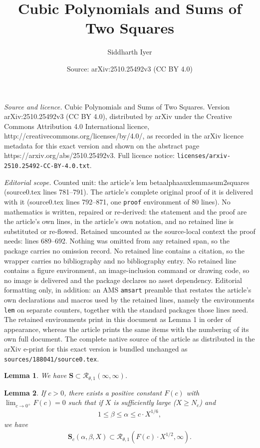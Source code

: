 \documentclass[10pt,a4paper]{amsart}
\title{Cubic Polynomials and Sums of Two Squares}
\author{Siddharth Iyer}
\date{Source: arXiv:2510.25492v3 (CC BY 4.0)}
\newtheorem{lem}{Lemma}
\begin{document}
\maketitle

\noindent\emph{Source and licence.} Cubic Polynomials and Sums of Two Squares. Version arXiv:2510.25492v3 (CC BY 4.0), distributed by arXiv under the Creative Commons Attribution 4.0 International licence, http://creativecommons.org/licenses/by/4.0/, as recorded in the arXiv licence metadata for this exact version and shown on the abstract page https://arxiv.org/abs/2510.25492v3. Full licence notice: \texttt{licenses/arxiv-2510.25492-CC-BY-4.0.txt}.\par\smallskip

\noindent\textit{Editorial scope.} Counted unit: the article's lem betaalphaauxlemmasum2squares (source0.tex lines 781--791). The article's complete original proof of it is delivered with it (source0.tex lines 792--871, one \texttt{proof} environment of 80 lines). No mathematics is written, repaired or re-derived: the statement and the proof are the article's own lines, in the article's own notation, and no retained line is substituted or re-flowed.  Retained uncounted as the source-local context the proof needs: lines 689--692.  Nothing was omitted from any retained span, so the package carries no omission record.  No retained line contains a citation, so the wrapper carries no bibliography and no bibliography entry.  No retained line contains a figure environment, an image-inclusion command or drawing code, so no image is delivered and the package declares no asset dependency.  Editorial formatting only, in addition: an AMS \texttt{amsart} preamble that restates the article's own declarations and macros used by the retained lines, namely the environments \texttt{lem} on separate counters, together with the standard packages those lines need.  The retained environments print in this document as Lemma 1 in order of appearance, whereas the article prints the same items with the numbering of its own full document.  The complete native source of the article as distributed in the arXiv e-print for this exact version is bundled unchanged as \texttt{sources/188041/source0.tex}.
\begin{lem}
\label{SsubsetRtheta1inftyinfty}
We have $\mathbf{S} \subset \mathcal{R}_{\theta,1}(\infty,\infty)$.
\end{lem}

\begin{lem}
\label{betaalphaauxlemmasum2squares}
If $c>0$, there exists a positive constant $F(c)$ with $\lim_{c\rightarrow 0^{+}}F(c) = 0$ such that if $X$ is sufficiently large ($X \geq N_{c}$) and 
\begin{align*}
1\leq \beta \leq \alpha \leq c\cdot X^{1/6},
\end{align*}
we have  
\begin{align*}
\mathbf{S}_{c}(\alpha,\beta,X) \subset \mathcal{R}_{\theta,1}(F(c)\cdot X^{1/2},\infty).
\end{align*}
\end{lem}
\end{document}
